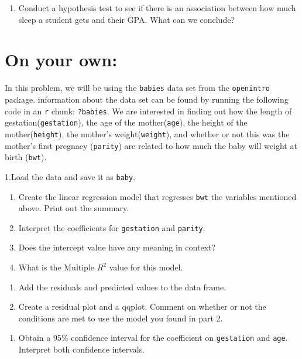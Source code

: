 \documentclass[]{article}
\providecommand{\tightlist}{%
  \setlength{\itemsep}{0pt}\setlength{\parskip}{0pt}}
\begin{document}
\newpage

\begin{enumerate}
\def\labelenumi{\arabic{enumi}.}
\setcounter{enumi}{7}
\tightlist
\item
  Conduct a hypothesis test to see if there is an association between
  how much sleep a student gets and their GPA. What can we conclude?
\end{enumerate}

\newpage

\hypertarget{on-your-own}{%
\section{On your own:}\label{on-your-own}}

In this problem, we will be using the \texttt{babies} data set from the
\texttt{openintro} package. information about the data set can be found
by running the following code in an \texttt{r} chunk: \texttt{?babies}.
We are interested in finding out how the length of
gestation(\texttt{gestation}), the age of the mother(\texttt{age}), the
height of the mother(\texttt{height}), the mother's
weight(\texttt{weight}), and whether or not this was the mother's first
pregnacy (\texttt{parity}) are related to how much the baby will weight
at birth (\texttt{bwt}).

1.Load the data and save it as \texttt{baby}.

\begin{enumerate}
\def\labelenumi{\arabic{enumi}.}
\setcounter{enumi}{1}
\item
  Create the linear regression model that regresses \texttt{bwt} the
  variables mentioned above. Print out the summary.
\item
  Interpret the coefficients for \texttt{gestation} and \texttt{parity}.
\item
  Does the intercept value have any meaning in context?
\item
  What is the Multiple \(R^2\) value for this model.
\end{enumerate}

\newpage

\begin{enumerate}
\def\labelenumi{\arabic{enumi}.}
\setcounter{enumi}{5}
\item
  Add the residuals and predicted values to the data frame.
\item
  Create a residual plot and a qqplot. Comment on whether or not the
  conditions are met to use the model you found in part 2.
\end{enumerate}

\newpage

\begin{enumerate}
\def\labelenumi{\arabic{enumi}.}
\setcounter{enumi}{7}
\tightlist
\item
  Obtain a 95\% confidence interval for the coefficient on
  \texttt{gestation} and \texttt{age}. Interpret both confidence
  intervals.
\end{enumerate}
\end{document}
